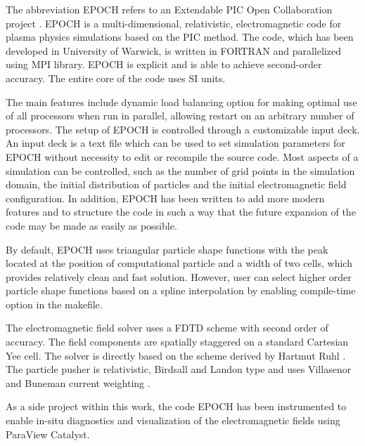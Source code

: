 The abbreviation EPOCH refers to an Extendable PIC Open Collaboration project \cite{bennett}. EPOCH is a multi-dimensional, relativistic, electromagnetic code for plasma physics simulations based on the PIC method. The code, which has been developed in University of Warwick, is written in FORTRAN and parallelized using MPI library. EPOCH is explicit and is able to achieve second-order accuracy. The entire core of the code uses SI units.

The main features include dynamic load balancing option for making optimal use of all processors when run in parallel, allowing restart on an arbitrary number of processors. The setup of EPOCH is controlled through a customizable input deck. An input deck is a text file which can be used to set simulation parameters for EPOCH without necessity to edit or recompile the source code. Most aspects of a simulation can be controlled, such as the number of grid points in the simulation domain, the initial distribution of particles and the initial electromagnetic field configuration. In addition, EPOCH has been written to add more modern features and to structure the code in such a way that the future expansion of the code may be made as easily as possible.

By default, EPOCH uses triangular particle shape functions with the peak located at the position of computational particle and a width of two cells, which provides relatively clean and fast solution. However, user can select higher order particle shape functions based on a spline interpolation by enabling compile-time option in the makefile.

The electromagnetic field solver uses a FDTD scheme with second order of accuracy. The field components are spatially staggered on a standard Cartesian Yee cell. The solver is directly based on the scheme derived by Hartmut Ruhl \cite{ruhl}. The particle pusher is relativistic, Birdsall and Landon type \cite{birdsall} and uses Villasenor and Buneman current weighting \cite{villasenor}.

As a side project within this work, the code EPOCH has been instrumented to enable in-situ diagnostics and visualization of the electromagnetic fields using ParaView Catalyst. 

